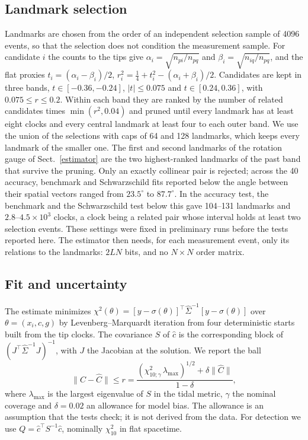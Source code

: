 \documentclass[11pt,a4paper]{article}
\begin{document}
\subsection{Landmark selection}\label{landmarks}
Landmarks are chosen from the order of an independent selection sample of
4096 events, so that the selection does not condition the measurement
sample. For candidate $i$ the counts to the tips give
$\alpha_i=\sqrt{n_{pi}/n_{pq}}$ and $\beta_i=\sqrt{n_{iq}/n_{pq}}$, and the
flat proxies $t_i=(\alpha_i-\beta_i)/2$,
$r_i^2=\tfrac14+t_i^2-(\alpha_i+\beta_i)/2$. Candidates are kept in three
bands, $t\in[-0.36,-0.24]$, $|t|\le0.075$ and $t\in[0.24,0.36]$, with
$0.075\le r\le0.2$. Within each band they are ranked by the number of
related candidates times $\min(r^2,0.04)$ and pruned until every landmark
has at least eight clocks and every central landmark at least four to each
outer band. We use the union of the selections with caps of 64 and 128
landmarks, which keeps every landmark of the smaller one. The first and
second landmarks of the rotation gauge of Sect.~\ref{estimator} are the two
highest-ranked landmarks of the past band that survive the pruning. Only an
exactly collinear pair is rejected; across the 40 accuracy, benchmark and
Schwarzschild fits reported below the angle between their spatial vectors
ranged from $23.5^\circ$ to $87.7^\circ$. In
the accuracy test, the benchmark and the
Schwarzschild test below this gave 104--131 landmarks and
$2.8$--$4.5\times10^3$ clocks, a clock
being a related pair whose interval holds at least two selection events.
These settings were fixed in preliminary runs before the tests reported
here. The estimator then needs, for each measurement event, only its
relations to the landmarks: $2LN$ bits, and no $N\times N$ order matrix.

\subsection{Fit and uncertainty}
The estimate minimizes
$\chi^2(\theta)=[y-\sigma(\theta)]^{\!\top}\widehat\Sigma^{-1}[y-\sigma(\theta)]$
over $\theta=(x_i,c,g)$ by Levenberg--Marquardt iteration from four
deterministic starts built from the tip clocks. The covariance $S$ of
$\hat c$ is the corresponding block of $(J^{\!\top}\widehat\Sigma^{-1}J)^{-1}$,
with $J$ the Jacobian at the solution. We report the ball
\begin{equation}
 \|C-\widehat C\|\le r=\frac{(\chi^2_{10;\gamma}\,\lambda_{\max})^{1/2}
 +\delta\|\widehat C\|}{1-\delta}, \label{ball}
\end{equation}
where $\lambda_{\max}$ is the largest eigenvalue of $S$ in the tidal metric,
$\gamma$ the nominal coverage and $\delta=0.02$ an allowance for model bias.
The allowance is an assumption that the tests check; it is not derived from
the data. For detection we use $Q=\hat c^{\top}S^{-1}\hat c$, nominally
$\chi^2_{10}$ in flat spacetime.
\end{document}
